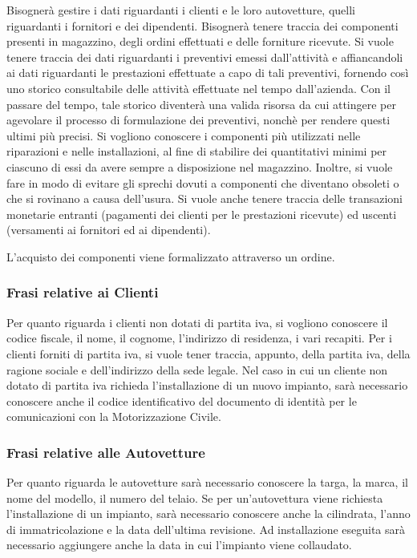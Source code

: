 			Bisognerà gestire i dati riguardanti i clienti e le loro autovetture, quelli riguardanti i fornitori e dei dipendenti. Bisognerà tenere traccia dei componenti presenti in magazzino, degli ordini effettuati e delle forniture ricevute.
			Si vuole tenere traccia dei dati riguardanti i preventivi emessi dall'attività e affiancandoli ai dati riguardanti le prestazioni effettuate a capo di tali preventivi, fornendo così uno storico consultabile delle attività effettuate nel tempo dall'azienda. Con il passare del tempo, tale storico diventerà una valida risorsa da cui attingere per agevolare il processo di formulazione dei preventivi, nonchè per rendere questi ultimi più precisi.
			Si vogliono conoscere i componenti più utilizzati nelle riparazioni e nelle installazioni, al fine di stabilire dei quantitativi minimi per ciascuno di essi da avere sempre a disposizione nel magazzino. Inoltre, si vuole fare in modo di evitare gli sprechi dovuti a componenti che diventano obsoleti o che si rovinano a causa dell'usura.
			Si vuole anche tenere traccia delle transazioni monetarie entranti (pagamenti dei clienti per le prestazioni ricevute) ed uscenti (versamenti ai fornitori ed ai dipendenti).
			
			L'acquisto dei componenti viene formalizzato attraverso un ordine.
			
		\subsubsection{Frasi relative ai Clienti}
		
			Per quanto riguarda i clienti non dotati di partita iva, si vogliono conoscere il codice fiscale, il nome, il cognome, l’indirizzo di residenza, i vari recapiti. Per i clienti forniti di partita iva, si vuole tener traccia, appunto, della partita iva, della ragione sociale e dell’indirizzo della sede legale. 
			Nel caso in cui un cliente non dotato di partita iva richieda l’installazione di un nuovo impianto, sarà necessario conoscere anche il codice identificativo del documento di identità per le comunicazioni con la Motorizzazione Civile.
		
		\subsubsection{Frasi relative alle Autovetture}
			
			Per quanto riguarda le autovetture sarà necessario conoscere la targa, la marca, il nome del modello, il numero del telaio. Se per un’autovettura viene richiesta l’installazione di un impianto, sarà necessario conoscere anche la cilindrata, l’anno di immatricolazione e la data dell’ultima revisione. Ad installazione eseguita sarà necessario aggiungere anche la data in cui l'impianto viene collaudato.
		
